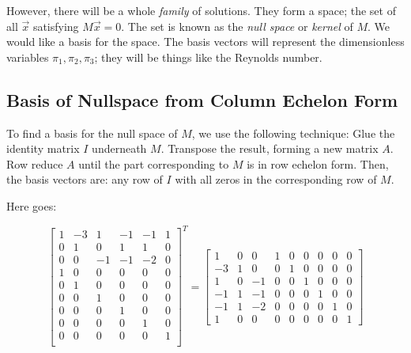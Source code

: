 \documentclass[12pt, a4paper, twoside, openright]{book}
\begin{document}
However, there will be a whole \emph{family} of solutions. They form a space; the set of all $\vec{x}$ satisfying $M\vec{x}= 0$.  The set is known as the \emph{null space} or \emph{kernel} of $M$.  We would like a basis for the space.  The basis vectors will represent the dimensionless variables $\pi_1,\pi_2, \pi_3$; they will be things like the Reynolds number.

\subsection{Basis of Nullspace from Column Echelon Form}

To find a basis for the null space of $M$, we use the following technique:
Glue the identity matrix $I$ underneath $M$.  Transpose the result, forming a new matrix $A$.  Row reduce $A$ until the part corresponding to $M$ is in row echelon form.  Then, the basis vectors are: any row of $I$ with all zeros in the corresponding row of $M$.

Here goes:

\begin{equation*} 
\begin{bmatrix}
1  & -3  &  1  & -1  & -1  &  1  \\
0  &  1  &  0  &  1  &  1  &  0  \\
0  &  0  & -1  & -1  & -2  &  0 \\
\hline
1  &  0  &  0  &  0  &  0  &  0 \\ 
0  &  1  &  0  &  0  &  0  &  0 \\ 
0  &  0  &  1  &  0  &  0  &  0 \\ 
0  &  0  &  0  &  1  &  0  &  0 \\ 
0  &  0  &  0  &  0  &  1  &  0 \\ 
0  &  0  &  0  &  0  &  0  &  1 \\ 
\end{bmatrix}^T
=
\begin{bmatrix}
1  &  0  &  0  &  1  &  0  &  0  &  0  &  0  &  0 \\
-3 &  1  &  0  &  0  &  1  &  0  &  0  &  0  &  0 \\
1  &  0  & -1  &  0  &  0  &  1  &  0  &  0  &  0 \\
-1 &  1  & -1  &  0  &  0  &  0  &  1  &  0  &  0 \\
-1 &  1  & -2  &  0  &  0  &  0  &  0  &  1  &  0 \\
1  &  0  &  0  &  0  &  0  &  0  &  0  &  0  &  1
\end{bmatrix}
\end{equation*}
\end{document}
